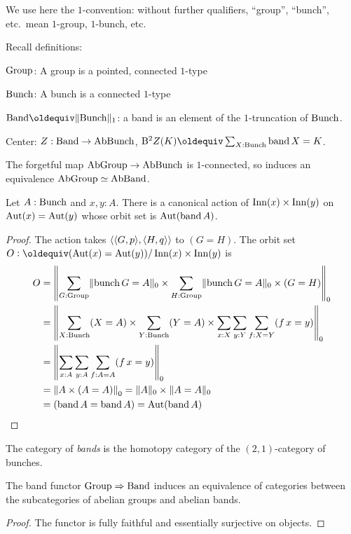 \label{ch:bunches}

We use here the $1$-convention: without further qualifiers, ``group'',
``bunch'', etc.~mean $1$-group, $1$-bunch, etc.

Recall definitions:

$\Group$: A group is a pointed, connected $1$-type

$\Bunch$: A bunch is a connected $1$-type

$\Band\jdeq\Trunc{\Bunch}_1$: a band is an element of the
$1$-truncation of $\Bunch$.

Center: $Z : \Band \to \AbBunch$, $\B^2Z(K) \jdeq \sum_{X : \Bunch}
\band X = K$.

The forgetful map $\AbGroup \to \AbBunch$ is $1$-connected, so induces
an equivalence $\AbGroup \equiv \AbBand$.

\begin{lemma}
  Let $A : \Bunch$ and $x,y:A$. There is a canonical action of
  $\Inn(x)\times\Inn(y)$ on $\Aut(x) = \Aut(y)$ whose orbit set is
  $\Aut(\band A)$.
\end{lemma}
\begin{proof}
  The action takes $\angled{\angled{G,p},\angled{H,q}}$ to $(G=H)$.
  The orbit set $O \defeq (\Aut(x)=\Aut(y)) / \Inn(x)\times\Inn(y)$ is
  \begin{align*}
    O
    &= \Trunc*{\sum_{G:\Group}\Trunc{\bunch G=A}_0 \times
      \sum_{H:\Group}\Trunc{\bunch G=A}_0 \times (G = H)}_0 \\
    &= \Trunc*{\sum_{X:\Bunch}(X=A) \times
      \sum_{Y:\Bunch}(Y=A) \times \sum_{x:X}\sum_{y:Y}\sum_{f:X=Y}(\mathop
      f x = y)}_0 \\
    &= \Trunc*{\sum_{x:A}\sum_{y:A}\sum_{f:A=A}(\mathop f x = y)}_0 \\
    &= \Trunc*{A \times (A = A)}_0 = \Trunc A_0 \times \Trunc{A=A}_0 \\
    &= (\band A = \band A) = \Aut(\band A) \qedhere
  \end{align*}
\end{proof}

\begin{definition}
  The category of \emph{bands} is the homotopy category of the
  $(2,1)$-category of bunches.
\end{definition}
\begin{lemma} %
  The band functor $\Group \Rightarrow \Band$ induces an equivalence
  of categories between the subcategories of abelian groups and
  abelian bands.
\end{lemma}
\begin{proof}
  The functor is fully faithful and essentially surjective on objects.
\end{proof}

